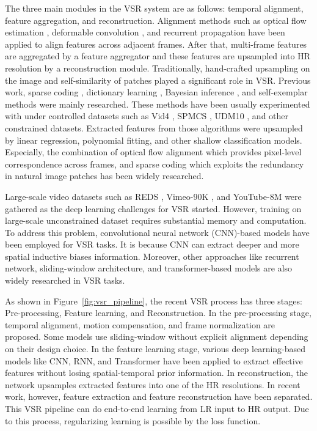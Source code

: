 The three main modules in the VSR system are as follows: 
temporal alignment, feature aggregation, and reconstruction. 
Alignment methods such as optical flow estimation 
\cite{teed2020raft}, deformable convolution 
\cite{dai2017deformable}, and recurrent propagation 
\cite{chan2021basicvsr} have been applied to align features 
across adjacent frames. After that, multi-frame features are 
aggregated by a feature aggregator and these features are 
upsampled into HR resolution by a reconstruction module. 
Traditionally, hand-crafted upsampling on the image and 
self-similarity of patches played a significant role in VSR. 
Previous work, sparse coding \cite{yang2010sparsecoding}, 
dictionary learning \cite{zeyde2010dictionary}, Bayesian 
inference \cite{liu2013vid4}, and self-exemplar methods 
\cite{glasner2009self} were mainly researched. These methods 
have been usually experimented with under controlled datasets 
such as Vid4 \cite{liu2013vid4}, SPMCS \cite{tao2017spmcs}, 
UDM10 \cite{yi2019udm10}, and other constrained datasets. 
Extracted features from those algorithms were upsampled by 
linear regression, polynomial fitting, and other shallow 
classification models. Especially, the combination of optical 
flow alignment which provides pixel-level correspondence across 
frames, and sparse coding which exploits the redundancy in 
natural image patches has been widely researched.


Large-scale video datasets such as REDS \cite{nah2019reds}, 
Vimeo-90K \cite{xue2019vimeo}, and YouTube-8M 
\cite{abu2016youtube8m} were gathered as the deep learning 
challenges for VSR started. However, training on large-scale 
unconstrained dataset requires substantial memory and 
computation. To address this problem, convolutional neural 
network (CNN)-based models have been employed for VSR tasks. 
It is because CNN \cite{lecun1998} can extract deeper and more 
spatial inductive biases information. Moreover, other 
approaches like recurrent network, sliding-window architecture, 
and transformer-based models are also widely researched in 
VSR tasks.


As shown in Figure~\ref{fig:vsr_pipeline}, the recent VSR 
process has three stages: Pre-processing, Feature learning, 
and Reconstruction. In the pre-processing stage, temporal 
alignment, motion compensation, and frame normalization are 
proposed. Some models use sliding-window without explicit 
alignment depending on their design choice. In the feature 
learning stage, various deep learning-based models like CNN, 
RNN, and Transformer have been applied to extract effective 
features without losing spatial-temporal prior information. 
In reconstruction, the network upsamples extracted features 
into one of the HR resolutions. In recent work, however, 
feature extraction and feature reconstruction have been 
separated. This VSR pipeline can do end-to-end learning from 
LR input to HR output. Due to this process, regularizing 
learning is possible by the loss function.



